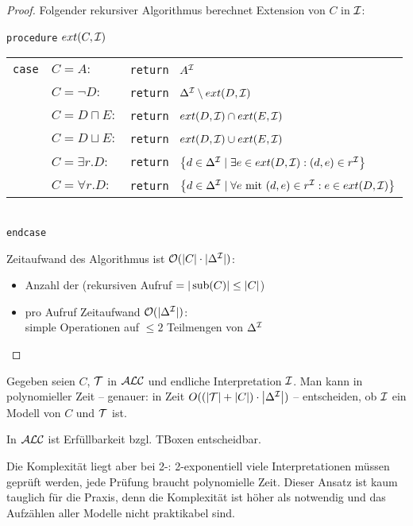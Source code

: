 \begin{proof}
    Folgender rekursiver Algorithmus berechnet Extension von $C$ in $\mathcal{I}$:

    \texttt{procedure} $ext(C, \mathcal{I})$\\
    \begin{tabular}{l l l}
        \texttt{case} & $C = A:$ & \texttt{return } $A^{\mathcal{I}}$\\
                      & $C = \neg D:$ & \texttt{return }
        $\Delta^{\mathcal{I}} \setminus ext(D, \mathcal{I})$\\
                      & $C = D \sqcap E:$ & \texttt{return }
        $ext(D, \mathcal{I}) \cap ext(E, \mathcal{I})$\\
                      & $C = D \sqcup E:$ & \texttt{return }
        $ext(D, \mathcal{I}) \cup ext(E, \mathcal{I})$\\
                      & $C = \exists r.D:$ & \texttt{return }
        $\left\{d\in \Delta^\MI \mid \exists e\in ext(D, \MI) : (d, e) \in r^\MI\right\}$\\
                      & $C = \forall r.D:$ & \texttt{return }
        $\left\{d\in \Delta^\MI \mid \forall e \text{ mit } (d, e) \in r^\MI : e\in ext(D, \MI)\right\}$\\
    \end{tabular}\\
    \texttt{endcase}

    Zeitaufwand des Algorithmus ist $\mathcal{O}(|C| \cdot |\Delta^{\mathcal{I}}|)$:
    \begin{itemize}
        \item Anzahl der (rekursiven Aufruf $= |\operatorname{sub}(C)| \leq |C|$)
        \item pro Aufruf Zeitaufwand $\mathcal{O}(|\Delta^{\mathcal{I}}|)$: \\
            simple Operationen auf $\leq 2$ Teilmengen von $\Delta^{\mathcal{I}}$
    \end{itemize}
\end{proof}

\begin{korollar}
Gegeben seien $C$, $\mathcal{T}$ in $\mathcal{A}\mathcal{L}\mathcal{C}$ und endliche Interpretation $\mathcal{I}$. Man kann in polynomieller Zeit -- genauer: in Zeit $O(\left( \left| \MT \right| + \left| C \right| \right) \cdot \left| \Delta^\MI \right|)$ -- entscheiden, ob $\mathcal{I}$ ein Modell von $C$ und $\mathcal{T}$ ist.
\end{korollar}

\begin{theorem}
In $\mathcal{A}\mathcal{L}\mathcal{C}$ ist Erfüllbarkeit bzgl. TBoxen entscheidbar.
\end{theorem}

Die Komplexität liegt aber bei 2-\ExpTime: 2-exponentiell viele
Interpretationen müssen geprüft werden, jede Prüfung braucht polynomielle Zeit.
Dieser Ansatz ist kaum tauglich für die Praxis, denn die Komplexität ist höher
als notwendig und das Aufzählen aller Modelle nicht praktikabel sind.
